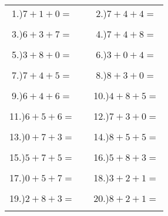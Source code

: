 \documentclass{article}
\begin{document}
\begin{tabular}{ccc}
1.)$7+1+0=$& \hspace{5cm} &2.)$7+4+4=$\\\\
3.)$6+3+7=$& \hspace{5cm} &4.)$7+4+8=$\\\\
5.)$3+8+0=$& \hspace{5cm} &6.)$3+0+4=$\\\\
7.)$7+4+5=$& \hspace{5cm} &8.)$8+3+0=$\\\\
9.)$6+4+6=$& \hspace{5cm} &10.)$4+8+5=$\\\\
11.)$6+5+6=$& \hspace{5cm} &12.)$7+3+0=$\\\\
13.)$0+7+3=$& \hspace{5cm} &14.)$8+5+5=$\\\\
15.)$5+7+5=$& \hspace{5cm} &16.)$5+8+3=$\\\\
17.)$0+5+7=$& \hspace{5cm} &18.)$3+2+1=$\\\\
19.)$2+8+3=$& \hspace{5cm} &20.)$8+2+1=$\\\\
\end{tabular}
\newpage
\end{document}
